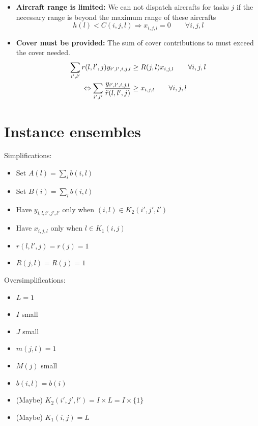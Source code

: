 \documentclass{article}
\begin{document}
\begin{itemize}
\item
\textbf{Aircraft range is limited:}
We can not dispatch aircrafts for tasks $j$ if the necessary range is beyond the maximum range of these aircrafts
\begin{equation} \label{eqn:constraint_range}
    h(l) < C(i, j, l) \Rightarrow x_{i, j, l} = 0 \qquad \forall i, j, l 
\end{equation}

\item
\textbf{Cover must be provided:}
The sum of cover contributions to must exceed the cover needed.
\begin{align}
    \sum_{i', l'} r(l, l', j) y_{i', l', i, j, l} & \geq R(j, l) x_{i, j, l} \qquad \forall i, j, l \notag \\
    \Leftrightarrow \sum_{i', l'} \frac{y_{i', l', i, j, l}}{\tilde r(l, l', j)} & \geq x_{i, j, l} \qquad \forall i, j, l \label{eqn:constraint_cover}
\end{align}
\end{itemize}

\section{Instance ensembles}
Simplifications:
\begin{itemize}
    \item Set $A(l) = \sum_{i} b(i, l)$
    \item Set $B(i) = \sum_{l} b(i, l)$
    \item Have $y_{i,l,i',j',l'}$ only when $(i, l) \in K_2(i', j', l')$
    \item Have $x_{i, j, l}$ only when $l \in K_1(i, j)$
    \item $r(l, l', j) = r(j) = 1$
    \item $R(j, l) = R(j) = 1$
\end{itemize}

\noindent
Oversimplifications:
\begin{itemize}
\item $L = 1$
\item $I$ small
\item $J$ small
\item $m(j, l) = 1$
\item $M(j)$ small 
\item $b(i, l) = b(i)$
\item (Maybe) $K_2(i', j', l') = I \times L = I \times \{1\}$
\item (Maybe) $K_1(i, j) = L$
\end{itemize}
\end{document}
